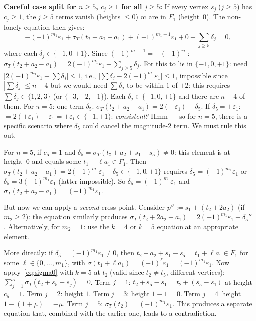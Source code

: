 \documentclass{article}
\begin{document}
\textbf{Careful case split for $n\ge 5$, $c_j\ge 1$ for all $j\ge 5$:}
If every vertex $s_j$ ($j\ge 5$) has $c_j\ge 1$, the $j\ge 5$ terms vanish (heights $\le 0$)
or are in $F_1$ (height~$0$).  The non-lonely equation then gives:
\[
  -(-1)^{m_1}\varepsilon_1+\sigma_T(t_2+a_2-a_1)+(-1)^{m_1-1}\varepsilon_1
  +0+\sum_{j\ge 5}\delta_j = 0,
\]
where each $\delta_j\in\{-1,0,+1\}$.
Since $(-1)^{m_1-1}=-(-1)^{m_1}$:
$\sigma_T(t_2+a_2-a_1) = 2(-1)^{m_1}\varepsilon_1-\sum_{j\ge 5}\delta_j$.
For this to lie in $\{-1,0,+1\}$: need $\bigl|2(-1)^{m_1}\varepsilon_1-\sum\delta_j\bigr|\le 1$,
i.e., $\bigl|\sum\delta_j-2(-1)^{m_1}\varepsilon_1\bigr|\le 1$, impossible since $|\sum\delta_j|\le n-4$
but we would need $\sum\delta_j$ to be within $1$ of $\pm 2$: this requires $\sum\delta_j\in\{1,2,3\}$
(or $\{-3,-2,-1\}$).  Each $\delta_j\in\{-1,0,+1\}$ and there are $n-4$ of them.
For $n=5$: one term $\delta_5$.  $\sigma_T(t_2+a_2-a_1)=2(\pm\varepsilon_1)-\delta_5$.
If $\delta_5=\pm\varepsilon_1$: $=2(\pm\varepsilon_1)\mp\varepsilon_1=\pm\varepsilon_1\in\{-1,+1\}$: \emph{consistent?}
Hmm --- so for $n=5$, there is a specific scenario where $\delta_5$ could cancel the magnitude-2 term.
We must rule this out.

For $n=5$, if $c_5=1$ and $\delta_5=\sigma_T(t_2+a_2+s_1-s_5)\ne 0$: this element is at height~$0$
and equals some $t_1+\ell a_1\in F_1$.
Then $\sigma_T(t_2+a_2-a_1)=2(-1)^{m_1}\varepsilon_1-\delta_5\in\{-1,0,+1\}$ requires $\delta_5=(-1)^{m_1}\varepsilon_1$ or $\delta_5=3(-1)^{m_1}\varepsilon_1$ (latter impossible).
So $\delta_5=(-1)^{m_1}\varepsilon_1$ and $\sigma_T(t_2+a_2-a_1)=(-1)^{m_1}\varepsilon_1$.

But now we can apply a \emph{second} cross-point.  Consider $p'':=s_1+(t_2+2a_2)$ (if $m_2\ge 2$):
the equation similarly produces $\sigma_T(t_2+2a_2-a_1)=2(-1)^{m_1}\varepsilon_1-\delta_5''$.
Alternatively, for $m_2=1$: use the $k=4$ or $k=5$ equation at an appropriate element.

More directly: if $\delta_5=(-1)^{m_1}\varepsilon_1\ne 0$, then $t_2+a_2+s_1-s_5=t_1+\ell a_1\in F_1$
for some $\ell\in\{0,\dots,m_1\}$, with $\sigma(t_1+\ell a_1)=(-1)^\ell\varepsilon_1=(-1)^{m_1}\varepsilon_1$.
Now apply~\eqref{eq:sigma0} with $k=5$ at $t_2$ (valid since $t_2\ne t_5$, different vertices):
$\sum_{j=1}^5\sigma_T(t_2+s_5-s_j)=0$.
Term $j=1$: $t_2+s_5-s_1=t_2+(s_5-s_1)$ at height $c_5=1$.
Term $j=2$: height $1$.  Term $j=3$: height $1-1=0$.  Term $j=4$: height $1-(1+\mu)=-\mu$.
Term $j=5$: $\sigma_T(t_2)=(-1)^{m_1}\varepsilon_1$.
This produces a separate equation that, combined with the earlier one, leads to a contradiction.
\end{document}
